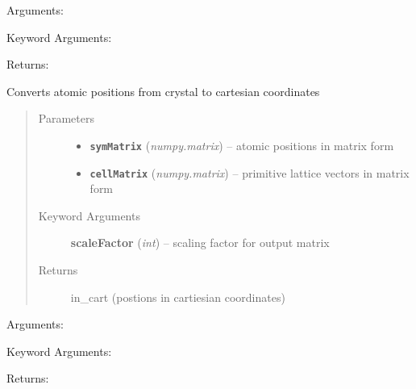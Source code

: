\documentclass[letterpaper,10pt,english]{sphinxmanual}
\begin{document}
\begin{fulllineitems}
\label{retr:retr.__conv2primPositions}
Arguments:

Keyword Arguments:

Returns:

\end{fulllineitems}


\begin{fulllineitems}
\label{retr:retr.__convertCartesian}
Converts atomic positions from crystal to cartesian coordinates
\begin{quote}\begin{description}
\item[{Parameters}] \leavevmode\begin{itemize}
\item {} 
\textbf{\texttt{symMatrix}} (\emph{numpy.matrix}) -- atomic positions in matrix form

\item {} 
\textbf{\texttt{cellMatrix}} (\emph{numpy.matrix}) -- primitive lattice vectors in matrix form

\end{itemize}

\item[{Keyword Arguments}] \leavevmode
\textbf{scaleFactor} (\emph{int}) --
scaling factor for output matrix

\item[{Returns}] \leavevmode
in\_cart (postions in cartiesian coordinates)

\end{description}\end{quote}

\end{fulllineitems}


\begin{fulllineitems}
\label{retr:retr.__convertCellBC}
Arguments:

Keyword Arguments:

Returns:

\end{fulllineitems}
\end{document}
